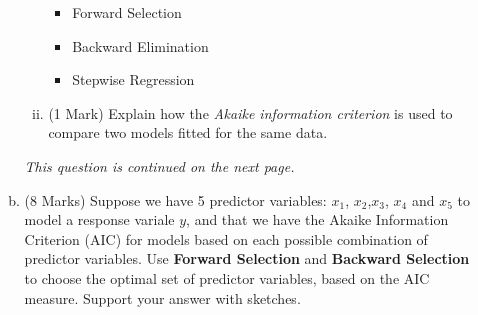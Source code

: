 \documentclass[a4paper,12pt]{article}
\begin{document}
\begin{enumerate}
\begin{enumerate}[(a)]
\begin{enumerate}[(i)]
\begin{itemize}
		\item Forward Selection
		\item Backward Elimination
		\item Stepwise Regression
\end{itemize}
\item (1 Mark)  Explain how the \emph{Akaike information criterion} is used to compare two models fitted for the same data.
\end{enumerate}
\noindent \textit{This question is continued on the next page.}
\newpage
\item (8 Marks) Suppose we have 5 predictor variables: $x_1$, $x_2$,$x_3$, $x_4$ and $x_5$ to model a response variale $y$, and that we have the Akaike Information Criterion (AIC) for models based on each possible combination of predictor variables.
Use \textbf{Forward Selection} and \textbf{Backward Selection} to choose the optimal set of predictor variables, based on the AIC measure.
Support your answer with sketches.

\end{enumerate}
\end{enumerate}
\end{document}

